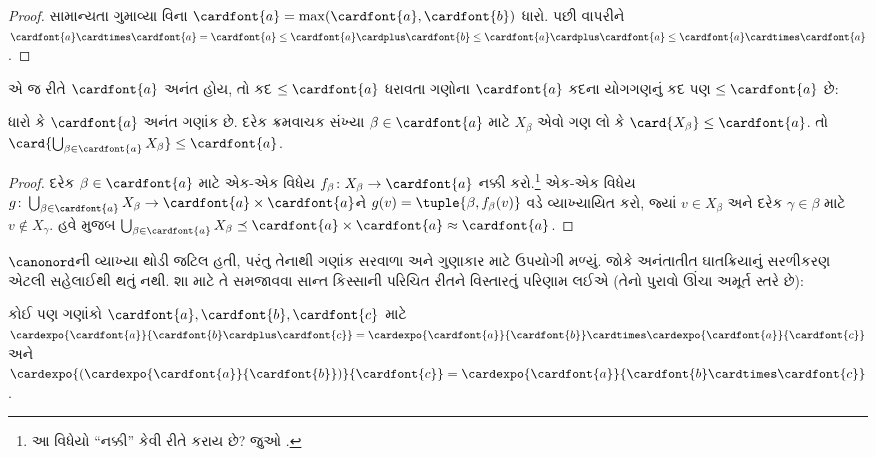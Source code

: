 \begin{proof}
સામાન્યતા ગુમાવ્યા વિના
$\cardfont{a} = \max(\cardfont{a},
\cardfont{b})$ ધારો. પછી 
વાપરીને
$\cardfont{a}\cardtimes\cardfont{a} = \cardfont{a} \leq \cardfont{a}
\cardplus \cardfont{b} \leq \cardfont{a} \cardplus \cardfont{a} \leq
\cardfont{a} \cardtimes \cardfont{a}$.
\end{proof}\noindent એ જ રીતે
$\cardfont{a}$ અનંત હોય, તો કદ
$\leq\cardfont{a}$ ધરાવતા ગણોના $\cardfont{a}$
કદના યોગગણનું કદ પણ $\leq\cardfont{a}$ છે:

\begin{prop}
ધારો કે $\cardfont{a}$ અનંત ગણાંક છે. દરેક
ક્રમવાચક સંખ્યા $\beta \in \cardfont{a}$ માટે
$X_\beta$ એવો ગણ લો કે
$\card{X_\beta} \leq \cardfont{a}$. તો
$\card{\bigcup_{\beta \in \cardfont{a}} X_\beta}
\leq \cardfont{a}$.
\end{prop}

\begin{proof}
દરેક $\beta \in \cardfont{a}$ માટે
એક-એક વિધેય $f_\beta \colon X_\beta \to
\cardfont{a}$ નક્કી કરો.\footnote{આ વિધેયો
``નક્કી'' કેવી રીતે કરાય છે? જુઓ
.}
એક-એક વિધેય $g \colon \bigcup_{\beta \in
\cardfont{a}} X_\beta \to \cardfont{a} \times
\cardfont{a}$ને $g(v) = \tuple{\beta, f_\beta(v)}$
વડે વ્યાખ્યાયિત કરો, જ્યાં $v \in X_\beta$
અને દરેક $\gamma \in \beta$ માટે
$v \notin X_\gamma$. હવે
 મુજબ
$\bigcup_{\beta \in \cardfont{a}} X_\beta \preceq
\cardfont{a} \times \cardfont{a} \approx \cardfont{a}$.
\end{proof}
\endgroup

\begingroup
\makeatletter{}\makeatother


\label{guunit:OLP-0589}


$\canonord$ની વ્યાખ્યા થોડી જટિલ હતી, પરંતુ તેનાથી
ગણાંક સરવાળા અને ગુણાકાર માટે ઉપયોગી
 મળ્યું. જોકે અનંતાતીત
ઘાતક્રિયાનું સરળીકરણ એટલી સહેલાઈથી થતું નથી.
શા માટે તે સમજાવવા સાન્ત કિસ્સાની પરિચિત રીતને
વિસ્તારતું પરિણામ લઈએ (તેનો પુરાવો ઊંચા અમૂર્ત
સ્તરે છે):

\begin{prop}
કોઈ પણ ગણાંકો $\cardfont{a}, \cardfont{b},
\cardfont{c}$ માટે
$\cardexpo{\cardfont{a}}{\cardfont{b} \cardplus \cardfont{c}} =
\cardexpo{\cardfont{a}}{\cardfont{b}} \cardtimes
\cardexpo{\cardfont{a}}{\cardfont{c}}$ અને
$\cardexpo{(\cardexpo{\cardfont{a}}{\cardfont{b}})}{\cardfont{c}} =
\cardexpo{\cardfont{a}}{\cardfont{b} \cardtimes \cardfont{c}}$.
\end{prop}

